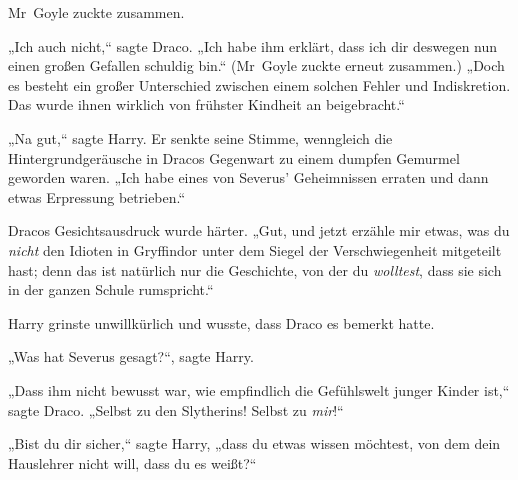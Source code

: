 Mr~Goyle zuckte zusammen.

„Ich auch nicht,“ sagte Draco. „Ich habe ihm erklärt, dass ich dir deswegen nun einen großen Gefallen schuldig bin.“ (Mr~Goyle zuckte erneut zusammen.) „Doch es besteht ein großer Unterschied zwischen einem solchen Fehler und Indiskretion. Das wurde ihnen wirklich von frühster Kindheit an beigebracht.“

„Na gut,“ sagte Harry. Er senkte seine Stimme, wenngleich die Hintergrundgeräusche in Dracos Gegenwart zu einem dumpfen Gemurmel geworden waren. „Ich habe eines von Severus’ Geheimnissen erraten und dann etwas Erpressung betrieben.“

Dracos Gesichtsausdruck wurde härter. „Gut, und jetzt erzähle mir etwas, was du \emph{nicht} den Idioten in Gryffindor unter dem Siegel der Verschwiegenheit mitgeteilt hast; denn das ist natürlich nur die Geschichte, von der du \emph{wolltest}, dass sie sich in der ganzen Schule rumspricht.“

Harry grinste unwillkürlich und wusste, dass Draco es bemerkt hatte.

„Was hat Severus gesagt?“, sagte Harry.

„Dass ihm nicht bewusst war, wie empfindlich die Gefühlswelt junger Kinder ist,“ sagte Draco. „Selbst zu den Slytherins! Selbst zu \emph{mir}!“

„Bist du dir sicher,“ sagte Harry, „dass du etwas wissen möchtest, von dem dein Hauslehrer nicht will, dass du es weißt?“

